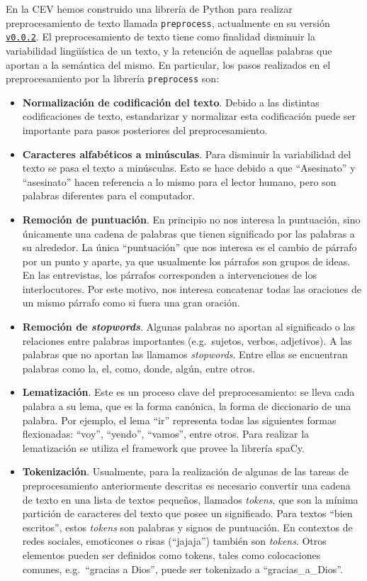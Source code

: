 \documentclass[
  spanish,
]{article}
\providecommand{\tightlist}{%
  \setlength{\itemsep}{0pt}\setlength{\parskip}{0pt}}
\begin{document}
En la CEV hemos construido una librería de Python para realizar
preprocesamiento de texto llamada \texttt{preprocess}, actualmente en su
versión
\href{https://gitlab.com/nlp-comision/text-preprocessing/-/releases/v0.0.2}{\texttt{v0.0.2}}.
El preprocesamiento de texto tiene como finalidad disminuir la
variabilidad lingüística de un texto, y la retención de aquellas
palabras que aportan a la semántica del mismo. En particular, los pasos
realizados en el preprocesamiento por la librería \texttt{preprocess}
son:

\begin{itemize}
\tightlist
\item
  \textbf{Normalización de codificación del texto}. Debido a las
  distintas codificaciones de texto, estandarizar y normalizar esta
  codificación puede ser importante para pasos posteriores del
  preprocesamiento.
\item
  \textbf{Caracteres alfabéticos a minúsculas}. Para disminuir la
  variabilidad del texto se pasa el texto a minúsculas. Esto se hace
  debido a que ``Asesinato'' y ``asesinato'' hacen referencia a lo mismo
  para el lector humano, pero son palabras diferentes para el
  computador.
\item
  \textbf{Remoción de puntuación}. En principio no nos interesa la
  puntuación, sino únicamente una cadena de palabras que tienen
  significado por las palabras a su alrededor. La única ``puntuación''
  que nos interesa es el cambio de párrafo por un punto y aparte, ya que
  usualmente los párrafos son grupos de ideas. En las entrevistas, los
  párrafos corresponden a intervenciones de los interlocutores. Por este
  motivo, nos interesa concatenar todas las oraciones de un mismo
  párrafo como si fuera una gran oración.
\item
  \textbf{Remoción de \textit{stopwords}}. Algunas palabras no aportan
  al significado o las relaciones entre palabras importantes
  (e.g.~sujetos, verbos, adjetivos). A las palabras que no aportan las
  llamamos \emph{stopwords}. Entre ellas se encuentran palabras como la,
  el, como, donde, algún, entre otros.
\item
  \textbf{Lematización}. Este es un proceso clave del preprocesamiento:
  se lleva cada palabra a su lema, que es la forma canónica, la forma de
  diccionario de una palabra. Por ejemplo, el lema ``ir'' representa
  todas las siguientes formas flexionadas: ``voy'', ``yendo'',
  ``vamos'', entre otros. Para realizar la lematización se utiliza el
  framework que provee la librería spaCy.
\item
  \textbf{Tokenización}. Usualmente, para la realización de algunas de
  las tareas de preprocesamiento anteriormente descritas es necesario
  convertir una cadena de texto en una lista de textos pequeños,
  llamados \emph{tokens}, que son la mínima partición de caracteres del
  texto que posee un significado. Para textos ``bien escritos'', estos
  \emph{tokens} son palabras y signos de puntuación. En contextos de
  redes sociales, emoticones o risas (``jajaja'') también son
  \emph{tokens}. Otros elementos pueden ser definidos como tokens, tales
  como colocaciones comunes, e.g.~``gracias a Dios'', puede ser
  tokenizado a ``gracias\_a\_Dios''.
\end{itemize}
\end{document}
